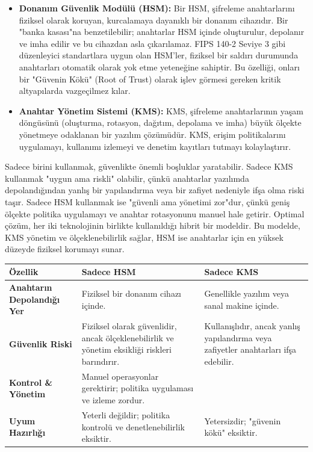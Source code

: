 \begin{itemize}
    \item \textbf{Donanım Güvenlik Modülü (HSM):} Bir HSM, şifreleme anahtarlarını fiziksel olarak koruyan, kurcalamaya dayanıklı bir donanım cihazıdır. Bir "banka kasası"na benzetilebilir; anahtarlar HSM içinde oluşturulur, depolanır ve imha edilir ve bu cihazdan asla çıkarılamaz. FIPS 140-2 Seviye 3 gibi düzenleyici standartlara uygun olan HSM'ler, fiziksel bir saldırı durumunda anahtarları otomatik olarak yok etme yeteneğine sahiptir. Bu özelliği, onları bir "Güvenin Kökü" (Root of Trust) olarak işlev görmesi gereken kritik altyapılarda vazgeçilmez kılar.
    \item \textbf{Anahtar Yönetim Sistemi (KMS):} KMS, şifreleme anahtarlarının yaşam döngüsünü (oluşturma, rotasyon, dağıtım, depolama ve imha) büyük ölçekte yönetmeye odaklanan bir yazılım çözümüdür. KMS, erişim politikalarını uygulamayı, kullanımı izlemeyi ve denetim kayıtları tutmayı kolaylaştırır.
\end{itemize}

Sadece birini kullanmak, güvenlikte önemli boşluklar yaratabilir. Sadece KMS kullanmak "uygun ama riskli" olabilir, çünkü anahtarlar yazılımda depolandığından yanlış bir yapılandırma veya bir zafiyet nedeniyle ifşa olma riski taşır. Sadece HSM kullanmak ise "güvenli ama yönetimi zor"dur, çünkü geniş ölçekte politika uygulamayı ve anahtar rotasyonunu manuel hale getirir. Optimal çözüm, her iki teknolojinin birlikte kullanıldığı hibrit bir modeldir. Bu modelde, KMS yönetim ve ölçeklenebilirlik sağlar, HSM ise anahtarlar için en yüksek düzeyde fiziksel korumayı sunar.

\begin{tabular}{|p{4cm}|p{6cm}|p{4cm}|}
\hline
\hline
\textbf{Özellik} & \textbf{Sadece HSM} & \textbf{Sadece KMS}  \\
\hline
\textbf{Anahtarın Depolandığı Yer} & Fiziksel bir donanım cihazı içinde. & Genellikle yazılım veya sanal makine içinde.  \\
\hline
\textbf{Güvenlik Riski} & Fiziksel olarak güvenlidir, ancak ölçeklenebilirlik ve yönetim eksikliği riskleri barındırır. & Kullanışlıdır, ancak yanlış yapılandırma veya zafiyetler anahtarları ifşa edebilir.  \\
\hline
\textbf{Kontrol \& Yönetim} & Manuel operasyonlar gerektirir; politika uygulaması ve izleme zordur.  \\
\hline
\textbf{Uyum Hazırlığı} & Yeterli değildir; politika kontrolü ve denetlenebilirlik eksiktir. & Yetersizdir; "güvenin kökü" eksiktir.  \\
\hline
\hline
\end{tabular}

